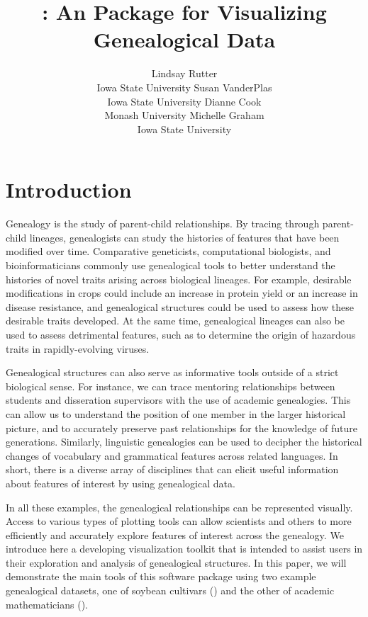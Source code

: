 \documentclass[article,shortnames]{jss}
\author{Lindsay Rutter\\Iowa State University \And 
        Susan VanderPlas\\Iowa State University \And
        Dianne Cook\\Monash University\And
        Michelle Graham\\Iowa State University}
\title{\pkg{ggenealogy}: An \proglang{R} Package for Visualizing Genealogical Data}
\begin{document}


\section{Introduction}

Genealogy is the study of parent-child relationships. By tracing through parent-child lineages, genealogists can study the histories of features that have been modified over time. Comparative geneticists, computational biologists, and bioinformaticians commonly use genealogical tools to better understand the histories of novel traits arising across biological lineages. For example, desirable modifications in crops could include an increase in protein yield or an increase in disease resistance, and genealogical structures could be used to assess how these desirable traits developed. At the same time, genealogical lineages can also be used to assess detrimental features, such as to determine the origin of hazardous traits in rapidly-evolving viruses.

Genealogical structures can also serve as informative tools outside of a strict biological sense. For instance, we can trace mentoring relationships between students and disseration supervisors with the use of academic genealogies. This can allow us to understand the position of one member in the larger historical picture, and to accurately preserve past relationships for the knowledge of future generations. Similarly, linguistic genealogies can be used to decipher the historical changes of vocabulary and grammatical features across related languages. In short, there is a diverse array of disciplines that can elicit useful information about features of interest by using genealogical data.

In all these examples, the genealogical relationships can be represented visually. Access to various types of plotting tools can allow scientists and others to more efficiently and accurately explore features of interest across the genealogy. We introduce here a developing visualization toolkit that is intended to assist users in their exploration and analysis of genealogical structures. In this paper, we will demonstrate the main tools of this software package using two example genealogical datasets, one of soybean cultivars (\citealt{soybean}) and the other of academic mathematicians (\citealt{mgp}).
\end{document}
